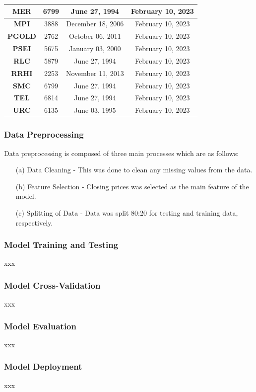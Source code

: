 \begin{longtable}{|c|c|c|c|}
    \textbf{MER}   & 6799                & June 27, 1994       & February 10, 2023 \\ \hline
    \textbf{MPI}   & 3888                & December 18, 2006   & February 10, 2023 \\ \hline
    \textbf{PGOLD} & 2762                & October 06, 2011    & February 10, 2023 \\ \hline
    \rowcolor[HTML]{9AFF99} 
    \textbf{PSEI}  & 5675                & January 03, 2000    & February 10, 2023 \\ \hline
    \textbf{RLC}   & 5879                & June 27, 1994       & February 10, 2023 \\ \hline
    \textbf{RRHI}  & 2253                & November 11, 2013   & February 10, 2023 \\ \hline
    \textbf{SMC}   & 6799                & June 27. 1994       & February 10, 2023 \\ \hline
    \textbf{TEL}   & 6814                & June 27, 1994       & February 10, 2023 \\ \hline
    \textbf{URC}   & 6135                & June 03, 1995       & February 10, 2023 \\ \hline
\end{longtable}

\subsubsection{Data Preprocessing}
\label{subsubsec:model_data_processing}
Data preprocessing is composed of three main processes which are as follows:
\begin{itemize}
    \item[(a)] Data Cleaning - This was done to clean any missing values from the data.
    \item[(b)] Feature Selection - Closing prices was selected as the main feature of the model.
    \item[(c)] Splitting of Data - Data was split 80:20 for testing and training data, respectively.
\end{itemize}

\subsubsection{Model Training and Testing}
\label{subsubsec:model_training_testing}
xxx

\subsubsection{Model Cross-Validation}
\label{subsubsec:model_cross_validation}
xxx

\subsubsection{Model Evaluation}
\label{subsubsec:model_evaluation}
xxx

\subsubsection{Model Deployment}
\label{subsubsec:model_deployment}
xxx